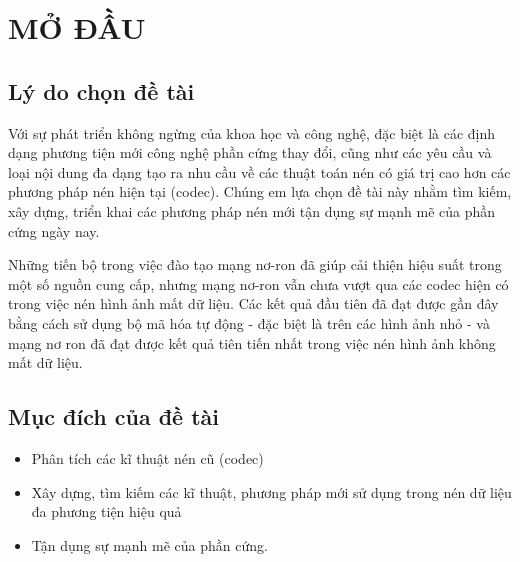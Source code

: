 

\chapter*{MỞ ĐẦU}
\label{part: dimred}

\section{Lý do chọn đề tài}

Với sự phát triển không ngừng của khoa học và công nghệ, đặc biệt là các định dạng phương tiện mới
công nghệ phần cứng thay đổi, cũng như các yêu cầu và loại nội dung đa dạng tạo ra nhu cầu
về các thuật toán nén có giá trị cao hơn các phương pháp nén hiện tại (codec). Chúng em lựa chọn
đề tài này nhằm tìm kiếm, xây dựng, triển khai các phương pháp nén mới tận dụng sự mạnh mẽ
của phần cứng ngày nay.

Những tiến bộ trong việc đào tạo mạng nơ-ron đã giúp cải thiện hiệu suất
trong một số nguồn cung cấp, nhưng mạng nơ-ron vẫn chưa vượt qua các codec
hiện có trong việc nén hình ảnh mất dữ liệu. Các kết quả đầu tiên đã đạt
được gần đây bằng cách sử dụng bộ mã hóa tự động - đặc biệt là trên các hình ảnh nhỏ
- và mạng nơ ron đã đạt được kết quả tiên tiến nhất trong việc nén hình ảnh
không mất dữ liệu.


\section{Mục đích của đề tài}

\begin{itemize}
      \item Phân tích các kĩ thuật nén cũ (codec)
      \item Xây dựng, tìm kiếm các kĩ thuật, phương pháp mới sử dụng trong nén dữ liệu
            đa phương tiện hiệu quả
      \item Tận dụng sự mạnh mẽ của phần cứng.
\end{itemize}

